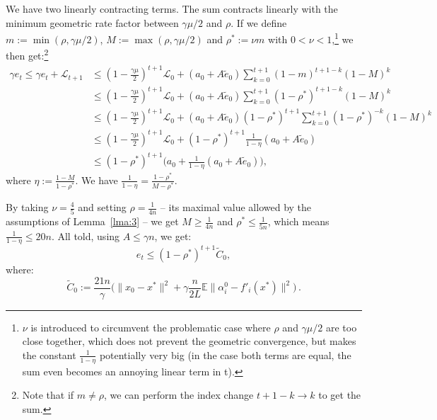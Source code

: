 \documentclass[twoside, 11pt]{article}
\newcommand{\stepsize}{\gamma}
\newcommand{\strongconvex}{\mu}
\newcommand{\contraction}{\rho}
\newcommand{\lyapunov}{\mathcal{L}}
\newcommand{\E}{\mathbb{E}}
\begin{document}
We have two linearly contracting terms.
The sum contracts linearly with the minimum geometric rate factor between $\stepsize \strongconvex / 2$ and $\contraction$.
If we define $m := \min(\contraction, \stepsize\strongconvex/2)$, $M := \max(\contraction, \stepsize\strongconvex/2)$ and $\contraction^* := \nu m$ with $0 <\nu < 1$,\footnote{$\nu$ is introduced to circumvent the problematic case where $\contraction$ and $\stepsize \strongconvex / 2$ are too close together, which does not prevent the geometric convergence, but makes the constant $\frac{1}{1-\eta}$ potentially very big (in the case both terms are equal, the sum even becomes an annoying linear term in t).} we then get:\footnote{Note that if $m \neq \contraction$, we can perform the index change $t+1-k \rightarrow k$ to get the sum.}
\begin{align}
\stepsize e_t \leq
\stepsize e_t + \lyapunov_{t+1}
&\leq (1-\frac{\stepsize\strongconvex}{2})^{t+1}\lyapunov_0 + (a_0 + A \tilde e_0) \sum_{k=0}^{t+1} (1 - m)^{t+1-k} (1-M)^k
\nonumber \\
&\leq (1-\frac{\stepsize\strongconvex}{2})^{t+1}\lyapunov_0 + (a_0 + A \tilde e_0) \sum_{k=0}^{t+1} (1 - \contraction^*)^{t+1-k} (1-M)^k
\nonumber \\
&\leq (1-\frac{\stepsize\strongconvex}{2})^{t+1}\lyapunov_0 + (a_0 + A \tilde e_0) (1 - \contraction^*)^{t+1} \sum_{k=0}^{t+1} (1 - \contraction^*)^{-k} (1-M)^k
\nonumber \\
&\leq (1-\frac{\stepsize\strongconvex}{2})^{t+1}\lyapunov_0 + (1 - \contraction^*)^{t+1} \frac{1}{1 -\eta} (a_0 + A \tilde e_0)
\nonumber \\
&\leq (1 - \contraction^*)^{t+1} \big(a_0 + \frac{1}{1 -\eta} (a_0 + A \tilde e_0) \big) ,
\end{align}
where $\eta := \frac{1-M}{1-\contraction^*}$.
We have $\frac{1}{1 - \eta} = \frac{1 - \contraction^*}{M - \contraction^*}$.

By taking $\nu = \frac{4}{5}$ and setting $\contraction = \frac{1}{4n}$ -- its maximal value allowed by the assumptions of Lemma~\ref{lma:3} -- we get $M \geq \frac{1}{4n}$ and $\contraction^* \leq \frac{1}{5n}$, which means $\frac{1}{1 - \eta} \leq 20n$.
All told, using $A \leq \stepsize n$, we get:
\begin{equation}
e_t \leq (1 - \contraction^*)^{t+1} \tilde C_0,
\end{equation}
where:
\begin{equation}
\tilde C_0 := \frac{21n}{\stepsize}\Big(\|x_0 - x^*\|^2 + \stepsize \frac{n}{2L}\E\|\alpha_i^0 - f'_i(x^*)\|^2\Big) \, .
\end{equation}
\end{document}
